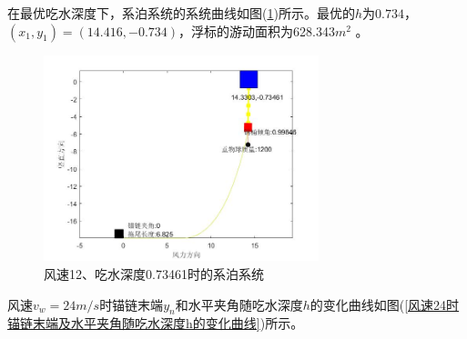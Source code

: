             在最优吃水深度下，系泊系统的系统曲线如图(\ref{风速12、吃水深度0.73461时的系泊系统})所示。最优的$h$为$0.734 $，$(x_1,y_1)=(14.416,-0.734)$，浮标的游动面积为628.343$m^2$ 。
            \begin{figure}[H]
                \centering
                \includegraphics[width=8cm]{images/v_wind_12_h_xitong.jpg}
                \caption{风速12、吃水深度0.73461时的系泊系统}
                \label{风速12、吃水深度0.73461时的系泊系统}
            \end{figure}
            \par
            风速$v_w=24m/s$时锚链末端$y_n$和水平夹角随吃水深度$h$的变化曲线如图(\ref{风速24时锚链末端及水平夹角随吃水深度h的变化曲线})所示。
